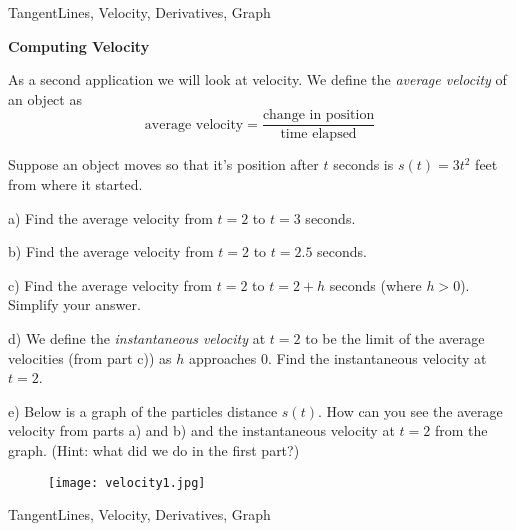 
\begin{tagblock}{TangentLines, Velocity, Derivatives, Graph}
\begin{question}
	

\bigskip

\textbf{Computing Velocity}

As a second application we will look at velocity.  We define the \emph{average velocity} of an object as
\[ \text{average velocity} = \frac{ \text{change in position}}{\text{time elapsed}} \]

Suppose an object moves so that it's position after $t$ seconds is $s(t)=3t^2$ feet from where it started.
\bigskip

a) Find the average velocity from $t=2$ to $t=3$ seconds.
\vspace{.5in}

b) Find the average velocity from $t=2$ to $t=2.5$ seconds.
\vspace{.5in}

c) Find the average velocity from $t=2$ to $t=2+h$ seconds (where $h>0$).  Simplify your answer.
\vspace{1in}

d) We define the \emph{instantaneous velocity} at $t=2$ to be the limit of the average velocities (from part c)) as $h$ approaches $0$.   Find the instantaneous velocity at $t=2$.

\vspace{.8in}

e)  Below is a graph of the particles distance $s(t)$.  How can you see the average velocity from parts a) and b) and the instantaneous velocity at $t=2$ from the graph. (Hint: what did we do in the first part?)
\begin{figure}[h]
\centering
\texttt{[image: velocity1.jpg]}
\end{figure}


\bigskip


	
	
\begin{tags}
	    TangentLines, Velocity, Derivatives, Graph
\end{tags}
	
\begin{diary}
\end{diary}
	
\begin{solution}
	   
\end{solution}
	
\end{question}

\end{tagblock}

